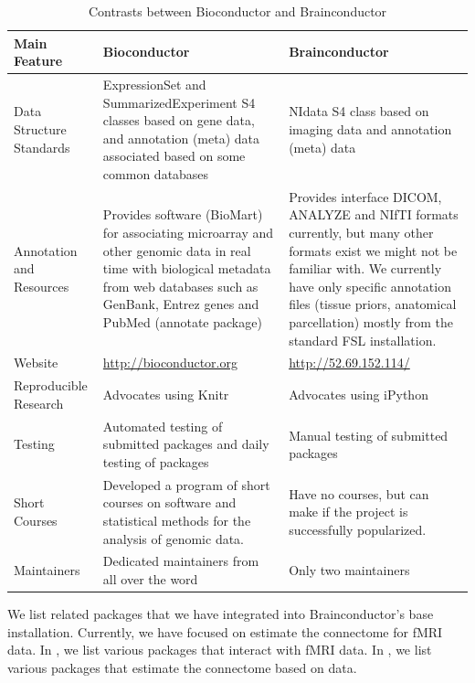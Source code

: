 \documentclass{nature}
\begin{document}
\begin{table}
\begin{footnotesize}
\begin{center}
    \begin{tabular}{ | p{2cm} | p{6.5cm} |  p{6.5cm} |}
    \hline
	Main Feature & \textbf{Bioconductor} & \textbf{Brainconductor} \\ \hline
	Data Structure Standards & ExpressionSet and SummarizedExperiment S4 classes based on gene data, and annotation (meta) data associated based on some common databases 
	& NIdata S4 class based on imaging data and annotation (meta) data \\\hline 
	Annotation and Resources & Provides software (BioMart) for associating microarray and other genomic data in real time with biological metadata from web databases such as GenBank, Entrez genes and PubMed (annotate package) & 
	Provides interface DICOM, ANALYZE and NIfTI formats currently, but many other formats exist we
	might not be familiar with. We currently have only specific annotation files (tissue priors,
	anatomical parcellation) mostly from the standard FSL installation. \\\hline
	Website & \url{http://bioconductor.org} & \url{http://52.69.152.114/} 
	\\\hline
	Reproducible Research & Advocates using Knitr & Advocates using iPython \\\hline
	Testing & Automated testing of submitted packages and daily testing of packages & Manual testing of submitted packages \\\hline
	Short Courses & Developed a program of short courses on software and statistical methods for the analysis of genomic data. & Have no courses, but can make if the project is successfully popularized. \\\hline
	Maintainers & Dedicated maintainers from all over the word & Only two maintainers \\\hline
    \end{tabular}
    \caption{Contrasts between Bioconductor and Brainconductor}
    \label{tab:bioconductor}
\end{center}
\end{footnotesize}
\end{table}

We list related packages that we have integrated into Brainconductor's 
base installation. Currently, we have focused on estimate the connectome for
fMRI data. In , we list various packages that interact with
fMRI data. In , we list various packages that estimate the connectome
based on data.
\end{document}
